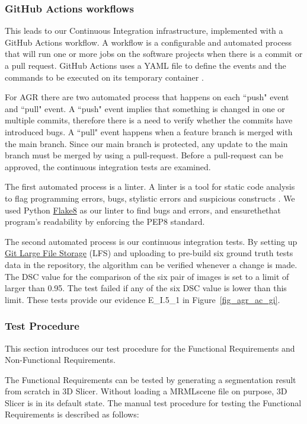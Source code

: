 \subsubsection{GitHub Actions workflows}
This leads to our Continuous Integration infrastructure, implemented with a GitHub Actions workflow. A workflow is a configurable and automated process that will run one or more jobs on the software projects when there is a commit or a pull request. GitHub Actions uses a YAML file to define the events and the commands to be executed on its temporary container \cite{GitHubActions}.

For AGR there are two automated process that happens on each ``push" event and ``pull" event. A ``push" event implies that something is changed in one or multiple commits, therefore there is a need to verify whether the commits have introduced bugs. A ``pull" event happens when a feature branch is merged with the main branch. Since our main branch is protected, any update to the main branch must be merged by using a pull-request. Before a pull-request can be approved, the continuous integration tests are examined. 

The first automated process is a linter. A linter is a tool for static code analysis to flag programming errors, bugs, stylistic errors and suspicious constructs  \cite{Linter}. We used Python \href{https://flake8.pycqa.org/en/latest/index.html#}{Flake8} as our linter to find bugs and errors, and ensurethethat program's readability by enforcing the PEP8 standard.

The second automated process is our continuous integration tests. By setting up \href{https://git-lfs.com/}{Git Large File Storage} (LFS) and uploading to pre-build six ground truth tests data in the repository, the algorithm can be verified whenever a change is made. The DSC value for the comparison of the six pair of images is set to a limit of larger than 0.95. The test failed if any of the six DSC value is lower than this limit. These tests provide our evidence E\_I.5\_1 in Figure~\ref{fig_agr_ac_gi}.

\subsubsection{Test Procedure}

This section introduces our test procedure for the Functional Requirements and Non-Functional Requirements.

The Functional Requirements can be tested by generating a segmentation result from scratch in 3D Slicer. Without loading a MRMLscene file on purpose, 3D Slicer is in its default state. The manual test procedure for testing the Functional Requirements is described as follows:

